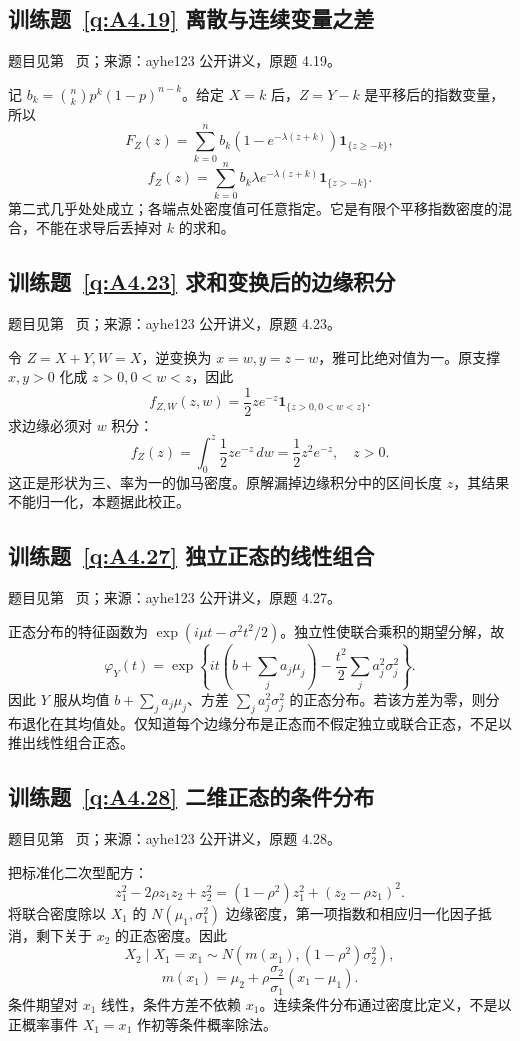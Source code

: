 \subsection*{训练题~\ref{q:A4.19} 离散与连续变量之差}\label{a:A4.19}{\small 题目见第~\pageref{q:A4.19} 页；来源：ayhe123 公开讲义，原题 4.19。}
\begin{solve}记 $b_k=\binom nkp^k(1-p)^{n-k}$。给定 $X=k$ 后，$Z=Y-k$ 是平移后的指数变量，所以\[F_Z(z)=\sum_{k=0}^n b_k(1-e^{-\lambda(z+k)})\mathbf1_{\{z\ge-k\}},\]\[f_Z(z)=\sum_{k=0}^n b_k\lambda e^{-\lambda(z+k)}\mathbf1_{\{z>-k\}}.\]第二式几乎处处成立；各端点处密度值可任意指定。它是有限个平移指数密度的混合，不能在求导后丢掉对 $k$ 的求和。\end{solve}

\subsection*{训练题~\ref{q:A4.23} 求和变换后的边缘积分}\label{a:A4.23}{\small 题目见第~\pageref{q:A4.23} 页；来源：ayhe123 公开讲义，原题 4.23。}
\begin{solve}令 $Z=X+Y,W=X$，逆变换为 $x=w,y=z-w$，雅可比绝对值为一。原支撑 $x,y>0$ 化成 $z>0,0<w<z$，因此\[f_{Z,W}(z,w)=\frac12ze^{-z}\mathbf1_{\{z>0,0<w<z\}}.\]求边缘必须对 $w$ 积分：\[f_Z(z)=\int_0^z\frac12ze^{-z}\,dw=\frac12z^2e^{-z},\quad z>0.\]这正是形状为三、率为一的伽马密度。原解漏掉边缘积分中的区间长度 $z$，其结果不能归一化，本题据此校正。\end{solve}

\subsection*{训练题~\ref{q:A4.27} 独立正态的线性组合}\label{a:A4.27}{\small 题目见第~\pageref{q:A4.27} 页；来源：ayhe123 公开讲义，原题 4.27。}
\begin{solve}正态分布的特征函数为 $\exp(i\mu t-\sigma^2t^2/2)$。独立性使联合乘积的期望分解，故\[\varphi_Y(t)=\exp\left\{it\left(b+\sum_ja_j\mu_j\right)-\frac{t^2}{2}\sum_ja_j^2\sigma_j^2\right\}.\]因此 $Y$ 服从均值 $b+\sum_ja_j\mu_j$、方差 $\sum_ja_j^2\sigma_j^2$ 的正态分布。若该方差为零，则分布退化在其均值处。仅知道每个边缘分布是正态而不假定独立或联合正态，不足以推出线性组合正态。\end{solve}

\subsection*{训练题~\ref{q:A4.28} 二维正态的条件分布}\label{a:A4.28}{\small 题目见第~\pageref{q:A4.28} 页；来源：ayhe123 公开讲义，原题 4.28。}
\begin{solve}把标准化二次型配方：\[z_1^2-2\rho z_1z_2+z_2^2=(1-\rho^2)z_1^2+(z_2-\rho z_1)^2.\]将联合密度除以 $X_1$ 的 $N(\mu_1,\sigma_1^2)$ 边缘密度，第一项指数和相应归一化因子抵消，剩下关于 $x_2$ 的正态密度。因此\[X_2\mid X_1=x_1\sim N(m(x_1),(1-\rho^2)\sigma_2^2),\]\[m(x_1)=\mu_2+\rho\frac{\sigma_2}{\sigma_1}(x_1-\mu_1).\]条件期望对 $x_1$ 线性，条件方差不依赖 $x_1$。连续条件分布通过密度比定义，不是以正概率事件 $X_1=x_1$ 作初等条件概率除法。\end{solve}

